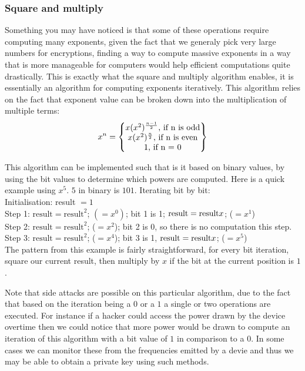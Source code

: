 \documentclass[conference]{IEEEtran}
\begin{document}
\subsubsection{Square and multiply}
Something you may have noticed is that some of these operations require 
computing many exponents, given the fact that we generaly pick very large 
numbers for encryptions, finding a way to compute massive exponents 
in a way that is more manageable for computers would help efficient computations 
quite drastically. This is exactly what the square and multiply algorithm
enables, it is essentially an algorithm for computing exponents iteratively.
This algorithm relies on the fact that exponent value can be broken down into
the multiplication of multiple terms:
\begin{equation*}
    x^{n} =    
    \begin{Bmatrix} 
        x\*(x^{2})^{\frac{n - 1}{2}} \textrm{, if n is odd} \\
        x\*(x^{2})^{\frac{n}{2}} \textrm{, if n is even} \\  
        1 \textrm{, if n = 0} \\  

     \end{Bmatrix}
\end{equation*}


This algorithm can be implemented such that is it based on binary values,
by using the bit values to determine which powers are computed.
Here is a quick example using $x^5$. $5$ in binary is $101$.
Iterating bit by bit: \\
Initialisation: result $= 1$ \\
Step 1: $\textrm{result}=\textrm{result}^2$; $(= x^0)$; bit 1 is 1; $\textrm{result} = \textrm{result}\*x$; ($= x^1$) \\
Step 2: $\textrm{result}=\textrm{result}^2$; ($= x^2$); bit 2 is 0, so there is no computation this step. \\
Step 3: $\textrm{result}=\textrm{result}^2$; ($= x^4$); bit 3 is 1, $\textrm{result} = \textrm{result}\*x$; ($= x^5$) \\

The pattern from this example is fairly straightforward, for every bit iteration, 
square our current result, then multiply by $x$ if the bit at the current position is $1$.


Note that side attacks are possible on this particular algorithm, due to 
the fact that based on the iteration being a $0$ or a $1$ a single or two
operations are executed. For instance if a hacker could access the power drawn
by the device overtime then we could notice that more power would be drawn to
compute an iteration of this algorithm with a bit value of $1$ in comparison to 
a $0$. In some cases we can monitor these from the frequencies emitted by a devie
and thus we may be able to obtain a private key using such methods.
\end{document}
